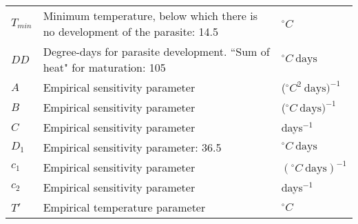\documentclass[a4paper,fleqn]{cas-dc}
\begin{document}
\begin{table}[width=2.0\linewidth,cols=3,pos=h]
\begin{tabular*}{\tblwidth}{@{} LLL@{} }
$T_{min}$  & Minimum temperature, below which there is no development of the parasite: 14.5 & $^\circ C$ \\ 
$DD$  & Degree-days for parasite development.
             ``Sum of heat" for maturation: 105 \cite{McCord2016} & $^\circ C \ \text{days}$ \\ 
$A$  & Empirical sensitivity parameter & ($^\circ C^2 \ \text{days})^{-1}$ \\ 
$B$  & Empirical sensitivity parameter & ($^\circ C \ \text{days})^{-1}$ \\ 
$C$  & Empirical sensitivity parameter & days$^{-1}$ \\ 
$D_1$  & Empirical sensitivity parameter: 36.5 & $^\circ C \ \text{days}$ \\ 
$c_1$  & Empirical sensitivity parameter & $(^\circ C \ \text{days})^{-1}$ \\ 
$c_2$  & Empirical sensitivity parameter & days$^{-1}$ \\ 
$T'$  & Empirical temperature parameter & $^\circ C$ \\ 
\bottomrule
\end{tabular*}
\end{table}

\printcredits

%





\end{document}
